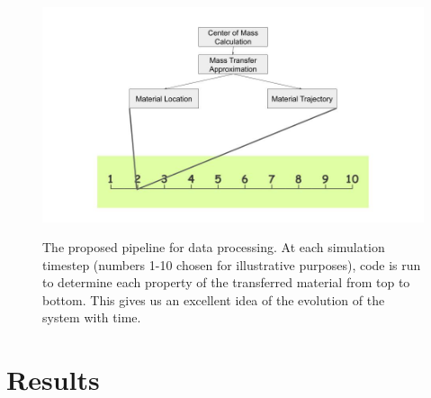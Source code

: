 \documentclass[linenumbers]{aastex631} %
\begin{document}
\begin{figure}
    \centering
    \includegraphics[width = \linewidth]{Untitled presentation.jpg}
    \label{fig:Untitled image}
    \caption{The proposed pipeline for data processing. At each simulation timestep (numbers 1-10 chosen for illustrative purposes), code is run to determine each property of the transferred material from top to bottom. This gives us an excellent idea of the evolution of the system with time.}
\end{figure}

\section{Results}
\end{document}
